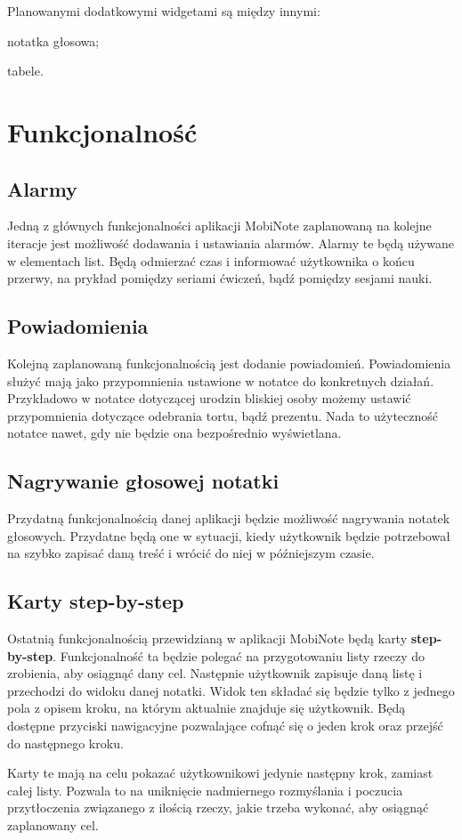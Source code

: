 Planowanymi dodatkowymi widgetami są między innymi:

\begin{compactitem}
    \item notatka głosowa;
    \item tabele.
\end{compactitem}

\section{Funkcjonalność}

\subsection{Alarmy}

Jedną z głównych funkcjonalności aplikacji MobiNote zaplanowaną na kolejne iteracje jest możliwość dodawania i ustawiania alarmów. Alarmy te będą używane w elementach list. Będą odmierzać czas i informować użytkownika o końcu przerwy, na prykład pomiędzy seriami ćwiczeń, bądź pomiędzy sesjami nauki.

\subsection{Powiadomienia}

Kolejną zaplanowaną funkcjonalnością jest dodanie powiadomień. Powiadomienia służyć mają jako przypomnienia ustawione w notatce do konkretnych działań. Przykładowo w notatce dotyczącej urodzin bliskiej osoby możemy ustawić przypomnienia dotyczące odebrania tortu, bądź prezentu. Nada to użyteczność notatce nawet, gdy nie będzie ona bezpośrednio wyświetlana.

\subsection{Nagrywanie głosowej notatki}

Przydatną funkcjonalnością danej aplikacji będzie możliwość nagrywania notatek głosowych. Przydatne będą one w sytuacji, kiedy użytkownik będzie potrzebował na szybko zapisać daną treść i wrócić do niej w późniejszym czasie.

\subsection{Karty step-by-step}

Ostatnią funkcjonalnością przewidzianą w aplikacji MobiNote będą karty \textbf{step-by-step}.
Funkcjonalność ta będzie polegać na przygotowaniu listy rzeczy do zrobienia, aby osiągnąć dany cel. Następnie użytkownik zapisuje daną listę i przechodzi do widoku danej notatki. Widok ten składać się będzie tylko z jednego pola z opisem kroku, na którym aktualnie znajduje się użytkownik. Będą dostępne przyciski nawigacyjne pozwalające cofnąć się o jeden krok oraz przejść do następnego kroku.

Karty te mają na celu pokazać użytkownikowi jedynie następny krok, zamiast całej listy. Pozwala to na uniknięcie nadmiernego rozmyślania i poczucia przytłoczenia związanego z ilością rzeczy, jakie trzeba wykonać, aby osiągnąć zaplanowany cel.